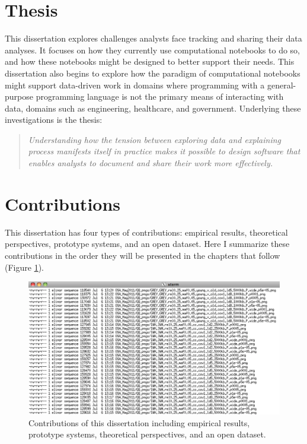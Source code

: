 \section{Thesis}

This dissertation explores challenges analysts face tracking and sharing their data analyses. It focuses on how they currently use computational notebooks to do so, and how these notebooks might be designed to better support their needs. This dissertation also begins to explore how the paradigm of computational notebooks might support data-driven work in domains where programming with a general-purpose programming language is not the primary means of interacting with data, domains such as engineering, healthcare, and government. Underlying these investigations is the thesis:

\begin{quote}
\emph{Understanding how the tension between exploring data and explaining process manifests itself in practice makes it possible to design software that enables analysts to document and share their work more effectively.}
\end{quote}

\section{Contributions}

This dissertation has four types of contributions: empirical results, theoretical perspectives, prototype systems, and an open dataset. Here I summarize these contributions in the order they will be presented in the chapters that follow (Figure \ref{fig:contributions}).

\begin{figure}[t!] 
  \centering
    \includegraphics[width=1.0\textwidth]{img/files}
  \caption[Contributions of this dissertation]
{Contributions of this dissertation including empirical results, prototype systems, theoretical perspectives, and an open dataset.}
  \label{fig:contributions}
\end{figure}

